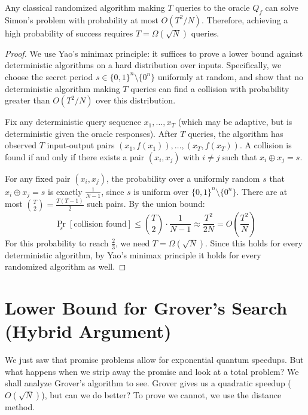 \begin{theorem}
    Any classical randomized algorithm making $T$ queries to the oracle $Q_f$ can solve Simon's problem with probability at most $O(T^2 / N)$. Therefore, achieving a high probability of success requires $T = \Omega(\sqrt{N})$ queries.
\end{theorem}

\begin{proof}
    We use Yao's minimax principle: it suffices to prove a lower bound against 
    deterministic algorithms on a hard distribution over inputs. Specifically, 
    we choose the secret period $s \in \{0,1\}^n \setminus \{0^n\}$ uniformly 
    at random, and show that no deterministic algorithm making $T$ queries can 
    find a collision with probability greater than $O(T^2/N)$ over this 
    distribution.

    Fix any deterministic query sequence $x_1, \dots, x_T$ (which may be 
    adaptive, but is deterministic given the oracle responses). After $T$ 
    queries, the algorithm has observed $T$ input-output pairs 
    $(x_1, f(x_1)), \dots, (x_T, f(x_T))$. A collision is found if and only 
    if there exists a pair $(x_i, x_j)$ with $i \neq j$ such that 
    $x_i \oplus x_j = s$.

    For any fixed pair $(x_i, x_j)$, the probability over a uniformly random 
    $s$ that $x_i \oplus x_j = s$ is exactly $\frac{1}{N-1}$, since $s$ is 
    uniform over $\{0,1\}^n \setminus \{0^n\}$. There are at most 
    $\binom{T}{2} = \frac{T(T-1)}{2}$ such pairs. By the union bound:
    \[ \Pr_s[\text{collision found}] \leq \binom{T}{2} \cdot \frac{1}{N-1} 
    \approx \frac{T^2}{2N} = O\!\left(\frac{T^2}{N}\right) \]
    For this probability to reach $\frac{2}{3}$, we need $T = \Omega(\sqrt{N})$.
    Since this holds for every deterministic algorithm, by Yao's minimax 
    principle it holds for every randomized algorithm as well.
\end{proof}

\section{Lower Bound for Grover's Search (Hybrid Argument)}
We just saw that promise problems allow for exponential quantum speedups. But what happens when we strip away the promise and look at a total problem? We shall analyze Grover's algorithm to see. Grover gives us a quadratic speedup ($O(\sqrt{N})$), but can we do better? To prove we cannot, we use the distance method.

